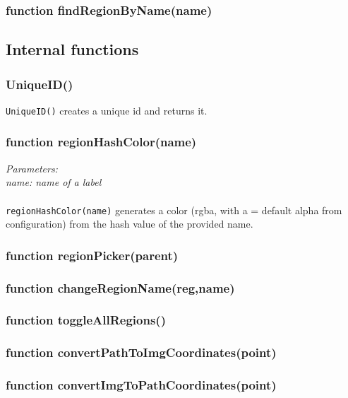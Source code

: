 \subsubsection{function findRegionByName(name)}


\subsection{Internal functions}
\subsubsection{UniqueID()}
\texttt{UniqueID()} creates a unique id and returns it.


\subsubsection{function regionHashColor(name)}
\emph{Parameters:\\
	name: name of a label\\ \\
}
\texttt{regionHashColor(name)} generates a color (rgba, with a = default alpha from configuration) from the hash value of the provided name.









\subsubsection{function regionPicker(parent)}
\subsubsection{function changeRegionName(reg,name)}
\subsubsection{function toggleAllRegions()}


\subsubsection{function convertPathToImgCoordinates(point)}
\subsubsection{function convertImgToPathCoordinates(point)}
